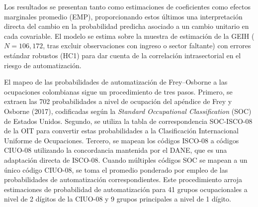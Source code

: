 \documentclass{article}
\begin{document}
Los resultados se presentan tanto como estimaciones de coeficientes como efectos marginales promedio (EMP), proporcionando estos \'ultimos una interpretaci\'on directa del cambio en la probabilidad predicha asociado a un cambio unitario en cada covariable. El modelo se estima sobre la muestra de estimaci\'on de la GEIH ($N = 106{,}172$, tras excluir observaciones con ingreso o sector faltante) con errores est\'andar robustos (HC1) para dar cuenta de la correlaci\'on intrasectorial en el riesgo de automatizaci\'on.

El mapeo de las probabilidades de automatizaci\'on de Frey--Osborne a las ocupaciones colombianas sigue un procedimiento de tres pasos. Primero, se extraen las 702 probabilidades a nivel de ocupaci\'on del ap\'endice de Frey y Osborne (2017), codificadas seg\'un la \textit{Standard Occupational Classification} (SOC) de Estados Unidos. Segundo, se utiliza la tabla de correspondencia SOC-ISCO-08 de la OIT para convertir estas probabilidades a la Clasificaci\'on Internacional Uniforme de Ocupaciones. Tercero, se mapean los c\'odigos ISCO-08 a c\'odigos CIUO-08 utilizando la concordancia mantenida por el DANE, que es una adaptaci\'on directa de ISCO-08. Cuando m\'ultiples c\'odigos SOC se mapean a un \'unico c\'odigo CIUO-08, se toma el promedio ponderado por empleo de las probabilidades de automatizaci\'on correspondientes. Este procedimiento arroja estimaciones de probabilidad de automatizaci\'on para 41 grupos ocupacionales a nivel de 2 d\'igitos de la CIUO-08 y 9 grupos principales a nivel de 1 d\'igito.
\end{document}
